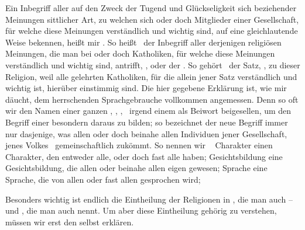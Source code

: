 \begin{aufza}
\item Ein Inbegriff aller auf den Zweck der Tugend und Glückseligkeit sich beziehender Meinungen sittlicher Art, zu welchen sich  oder doch  Mitglieder einer Gesellschaft, für welche diese Meinungen verständlich und wichtig sind, auf eine gleichlautende Weise bekennen, heißt mir . So heißt \zB\ der Inbegriff aller derjenigen religiösen Meinungen, die man bei  oder doch  Katholiken, für welche diese Meinungen verständlich und wichtig sind, antrifft, , oder der . So gehört \zB\ der Satz, , zu dieser Religion, weil alle gelehrten Katholiken, für die allein jener Satz verständlich und wichtig ist, hierüber einstimmig sind. Die hier gegebene Erklärung ist, wie mir däucht, dem herrschenden Sprachgebrauche vollkommen angemessen. Denn so oft wir den Namen einer ganzen , , , \udgl\ irgend einem  als Beiwort beigesellen, um den Begriff einer besondern  daraus zu bilden; so bezeichnet der neue Begriff immer nur dasjenige, was allen oder doch beinahe allen Individuen jener Gesellschaft, jenes Volkes \usw\ gemeinschaftlich zukömmt. So nennen wir \zB\  Charakter einen Charakter, den entweder alle, oder doch fast alle  haben;  Gesichtsbildung eine Gesichtsbildung, die allen oder beinahe allen  eigen gewesen;  Sprache eine Sprache, die von allen oder fast allen  gesprochen wird; \usw\
\item Besonders wichtig ist endlich die Eintheilung der Religionen in , die man auch  -- und , die man auch  nennt. Um aber diese Eintheilung gehörig zu verstehen, müssen wir erst den  selbst erklären.
\end{aufza}

